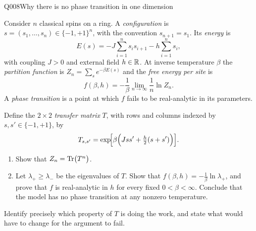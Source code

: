 \begin{entry}{Q008}{Why there is no phase transition in one dimension}


\begin{problem}
Consider $n$ classical spins on a ring. A \emph{configuration} is
$s=(s_1,\dots,s_n)\in\{-1,+1\}^{n}$, with the convention $s_{n+1}=s_1$. Its
\emph{energy} is
\[
  E(s)=-J\sum_{i=1}^{n}s_i s_{i+1}-h\sum_{i=1}^{n}s_i ,
\]
with coupling $J>0$ and external field $h\in\mathbb{R}$. At inverse temperature $\beta$ the
\emph{partition function} is $Z_n=\sum_{s}e^{-\beta E(s)}$ and the \emph{free energy per
site} is
\[
  f(\beta,h)=-\frac{1}{\beta}\lim_{n\to\infty}\frac{1}{n}\ln Z_n .
\]
A \emph{phase transition} is a point at which $f$ fails to be real-analytic in its
parameters.

Define the $2\times 2$ \emph{transfer matrix} $T$, with rows and columns indexed by
$s,s'\in\{-1,+1\}$, by
\[
  T_{s,s'}=\exp\!\Bigl[\beta\Bigl(Jss'+\tfrac{h}{2}(s+s')\Bigr)\Bigr].
\]

\begin{enumerate}[label=\textbf{(\alph*)},leftmargin=*]
  \item Show that $Z_n=\operatorname{Tr}\bigl(T^{n}\bigr)$.
  \item Let $\lambda_{+}\ge\lambda_{-}$ be the eigenvalues of $T$. Show that
        $f(\beta,h)=-\tfrac{1}{\beta}\ln\lambda_{+}$, and prove that $f$ is real-analytic
        in $h$ for every fixed $0<\beta<\infty$. Conclude that the model has no phase
        transition at any nonzero temperature.
\end{enumerate}
Identify precisely which property of $T$ is doing the work, and state what would have to
change for the argument to fail.
\end{problem}


\end{entry}
